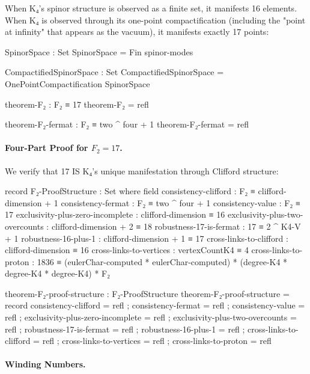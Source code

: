 \documentclass[11pt,a4paper]{book}
\begin{document}
When K₄'s spinor structure is observed as a finite set, it manifests 16 elements. When K₄ 
is observed through its one-point compactification (including the "point at infinity" that 
appears as the vacuum), it manifests exactly 17 points:

\begin{code}
SpinorSpace : Set
SpinorSpace = Fin spinor-modes

CompactifiedSpinorSpace : Set
CompactifiedSpinorSpace = OnePointCompactification SpinorSpace

theorem-F₂ : F₂ ≡ 17
theorem-F₂ = refl

theorem-F₂-fermat : F₂ ≡ two ^ four + 1
theorem-F₂-fermat = refl
\end{code}

\paragraph{Four-Part Proof for $F_2 = 17$.}

We verify that 17 IS K₄'s unique manifestation through Clifford structure:

\begin{code}
record F₂-ProofStructure : Set where
  field
    consistency-clifford : F₂ ≡ clifford-dimension + 1
    consistency-fermat : F₂ ≡ two ^ four + 1
    consistency-value : F₂ ≡ 17
    exclusivity-plus-zero-incomplete : clifford-dimension ≡ 16
    exclusivity-plus-two-overcounts : clifford-dimension + 2 ≡ 18
    robustness-17-is-fermat : 17 ≡ 2 ^ K4-V + 1
    robustness-16-plus-1 : clifford-dimension + 1 ≡ 17
    cross-links-to-clifford : clifford-dimension ≡ 16
    cross-links-to-vertices : vertexCountK4 ≡ 4
    cross-links-to-proton : 1836 ≡ (eulerChar-computed * eulerChar-computed) * (degree-K4 * degree-K4 * degree-K4) * F₂

theorem-F₂-proof-structure : F₂-ProofStructure
theorem-F₂-proof-structure = record
  { consistency-clifford = refl
  ; consistency-fermat = refl
  ; consistency-value = refl
  ; exclusivity-plus-zero-incomplete = refl
  ; exclusivity-plus-two-overcounts = refl
  ; robustness-17-is-fermat = refl
  ; robustness-16-plus-1 = refl
  ; cross-links-to-clifford = refl
  ; cross-links-to-vertices = refl
  ; cross-links-to-proton = refl
  }
\end{code}

\paragraph{Winding Numbers.}
\end{document}
